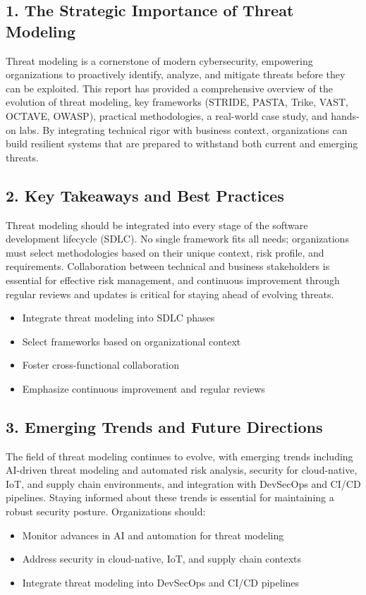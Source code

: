 

\subsection*{1. The Strategic Importance of Threat Modeling}
Threat modeling is a cornerstone of modern cybersecurity, empowering organizations to proactively identify, analyze, and mitigate threats before they can be exploited\cite{shostack2014,uceda2015,owasp}. This report has provided a comprehensive overview of the evolution of threat modeling, key frameworks (STRIDE, PASTA, Trike, VAST, OCTAVE, OWASP), practical methodologies, a real-world case study, and hands-on labs. By integrating technical rigor with business context, organizations can build resilient systems that are prepared to withstand both current and emerging threats.

\subsection*{2. Key Takeaways and Best Practices}
Threat modeling should be integrated into every stage of the software development lifecycle (SDLC)\cite{shostack2014}. No single framework fits all needs; organizations must select methodologies based on their unique context, risk profile, and requirements\cite{uceda2015}. Collaboration between technical and business stakeholders is essential for effective risk management\cite{nist800154}, and continuous improvement through regular reviews and updates is critical for staying ahead of evolving threats\cite{owasp}.
\begin{itemize}
	\item Integrate threat modeling into SDLC phases
	\item Select frameworks based on organizational context
	\item Foster cross-functional collaboration
	\item Emphasize continuous improvement and regular reviews
\end{itemize}

\subsection*{3. Emerging Trends and Future Directions}
The field of threat modeling continues to evolve, with emerging trends including AI-driven threat modeling and automated risk analysis\cite{owasp}, security for cloud-native, IoT, and supply chain environments\cite{nist800154}, and integration with DevSecOps and CI/CD pipelines. Staying informed about these trends is essential for maintaining a robust security posture. Organizations should:
\begin{itemize}
	\item Monitor advances in AI and automation for threat modeling
	\item Address security in cloud-native, IoT, and supply chain contexts
	\item Integrate threat modeling into DevSecOps and CI/CD pipelines
\end{itemize}

